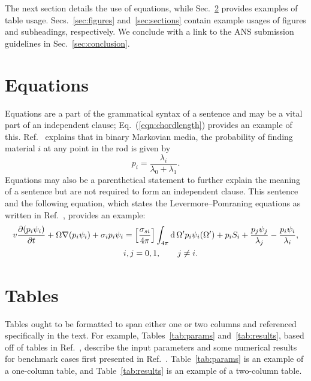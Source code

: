 \documentclass{nseJournal}
\begin{document}
The next section details the use of equations, while Sec.~\ref{sec:tables} provides examples of table usage.
Secs.~\ref{sec:figures} and~\ref{sec:sections} contain example usages of figures and subheadings, respectively.
We conclude with a link to the ANS submission guidelines in Sec.~\ref{sec:conclusion}.



\section{Equations}
\label{sec:equations}

Equations are a part of the grammatical syntax of a sentence and may be a vital part of an independent clause; Eq.~(\ref{eqn:chordlength}) provides an example of this.
Ref.~\cite{AdamsJQSRT1989} explains that in binary Markovian media, the probability of finding material \(i\) at any point in the rod is given by
\begin{equation}
  p_i = \frac{\lambda_i}{\lambda_0 + \lambda_1}.
  \label{eqn:chordlength}
\end{equation}
Equations may also be a parenthetical statement to further explain the meaning of a sentence but are not required to form an independent clause.
This sentence and the following equation, which states the Levermore--Pomraning equations as written in Ref.~\cite{AdamsJQSRT1989}, provides an example:
\begin{align}
\begin{split}
  v \frac{\partial(p_i \psi_i)}{\partial t} + \Omega \nabla(p_i \psi_i) + \sigma_i p_i \psi_i &= \left[ \frac{\sigma_{si}}{4\pi} \right] \int_{4\pi} \operatorname{d} \Omega' p_i \psi_i(\Omega') + p_i S_i + \frac{p_j \psi_j}{\lambda_j} - \frac{p_i \psi_i}{\lambda_i}, \\ 
  & i, j = 0,1, \qquad j \neq i.
\end{split}
  \label{eqn:LPequations}
\end{align}



\section{Tables}
\label{sec:tables}

Tables ought to be formatted to span either one or two columns and referenced specifically in the text.
For example, Tables~\ref{tab:params} and~\ref{tab:results}, based off of tables in Ref.~\cite{BrantleyMC2009Incident}, describe the input parameters and some numerical results for benchmark cases first presented in Ref.~\cite{AdamsJQSRT1989}.
Table~\ref{tab:params} is an example of a one-column table, and Table~\ref{tab:results} is an example of a two-column table.
\end{document}
